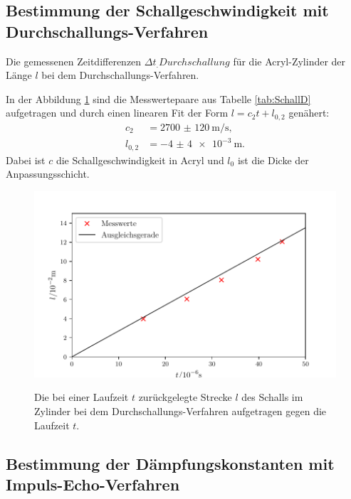 \subsection{Bestimmung der Schallgeschwindigkeit mit Durchschallungs-Verfahren}

\begin{table}
	\centering
	\caption{Die gemessenen Zeitdifferenzen $\Delta t_.{Durchschallung}$ für die Acryl-Zylinder der Länge $l$ bei dem Durchschallungs-Verfahren.}
	
	\label{tab:SchallD}
\end{table}

\noindent In der Abbildung \ref{fig:SchallD} sind die Messwertepaare aus Tabelle \ref{tab:SchallD} aufgetragen und durch einen linearen Fit der Form $l=c_2 t + l_{0,2}$ genähert:
\begin{align*}
	c_2&=\SI{2700(120)}{\meter\per\second}\text{,}\\
	l_{0,2}&=\SI{-4(4)e-3}{\meter}\text{.}
\end{align*}
Dabei ist $c$ die Schallgeschwindigkeit in Acryl und $l_0$ ist die Dicke der Anpassungsschicht.

\begin{figure}
	\centering
	\caption{Die bei einer Laufzeit $t$ zurückgelegte Strecke $l$ des Schalls im Zylinder bei dem Durchschallungs-Verfahren aufgetragen gegen die Laufzeit $t$.}
	\includegraphics[width=\linewidth-70pt,height=\textheight-70pt,keepaspectratio]{content/images/SchallgeschwindigkeitDurchschallung.pdf}
	\label{fig:SchallD}
\end{figure}

\subsection{Bestimmung der Dämpfungskonstanten mit Impuls-Echo-Verfahren}

